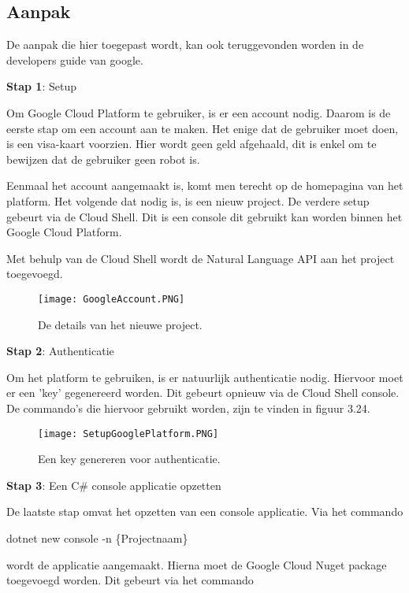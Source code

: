\subsection{Aanpak}
\label{aanpakgoogleplatform}

De aanpak die hier toegepast wordt, kan ook teruggevonden worden in de developers guide van google. \autocite{Codelabs2021}

\textbf{Stap 1}: Setup

Om Google Cloud Platform te gebruiker, is er een account nodig. Daarom is de eerste stap om een account aan te maken. Het enige dat de gebruiker moet doen, is een visa-kaart voorzien. Hier wordt geen geld afgehaald, dit is enkel om te bewijzen dat de gebruiker geen robot is. 

Eenmaal het account aangemaakt is, komt men terecht op de homepagina van het platform. Het volgende dat nodig is, is een nieuw project. De verdere setup gebeurt via de Cloud Shell. Dit is een console dit gebruikt kan worden binnen het Google Cloud Platform. 

Met behulp van de Cloud Shell wordt de Natural Language API aan het project toegevoegd. 

\begin{figure}[!htbp]
    \texttt{[image: GoogleAccount.PNG]}
    \caption{\label{googleaccount}De details van het nieuwe project.}
\end{figure}
\FloatBarrier 

\textbf{Stap 2}: Authenticatie

Om het platform te gebruiken, is er natuurlijk authenticatie nodig. Hiervoor moet er een 'key' gegenereerd worden. Dit gebeurt opnieuw via de Cloud Shell console. De commando's die hiervoor gebruikt worden, zijn te vinden in figuur 3.24.

\begin{figure}[!htbp]
    \texttt{[image: SetupGooglePlatform.PNG]}
    \caption{\label{setupgoogleplatform}Een key genereren voor authenticatie.}
\end{figure}
\FloatBarrier 

\textbf{Stap 3}: Een C\# console applicatie opzetten

De laatste stap omvat het opzetten van een console applicatie. Via het commando 

dotnet new console -n \{Projectnaam\} 

wordt de applicatie aangemaakt. Hierna moet de Google Cloud Nuget package toegevoegd worden. Dit gebeurt via het commando


